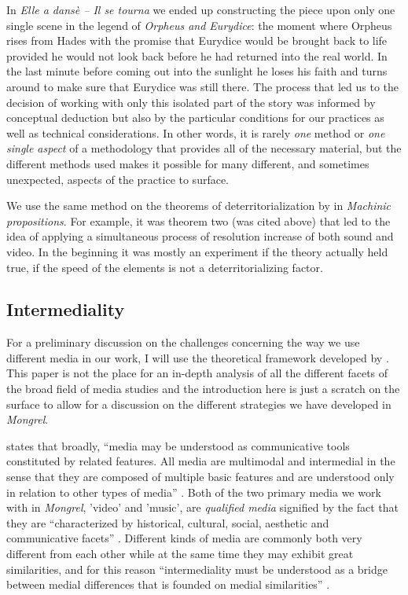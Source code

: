 \documentclass[11pt]{article}
\begin{document}
In \emph{Elle a dansè – Il se tourna} we ended up constructing the
piece upon only one single scene in the legend of \emph{Orpheus and
  Eurydice}: the moment where Orpheus rises from Hades with the
promise that Eurydice would be brought back to life provided he would
not look back before he had returned into the real world. In the last minute before coming out
into the sunlight he loses his faith and turns around to make sure
that Eurydice was still there. The process
that led us to the decision of working with only this isolated part of
the story was informed by conceptual deduction but also by the
particular conditions for our practices as well as technical
considerations. In other words, it is rarely \emph{one} method or \emph{one single
aspect} of a methodology that provides all of the necessary material,
but the different methods used makes it possible for many different,
and sometimes unexpected, aspects of the practice to surface.

We use the same method on the theorems of deterritorialization by
\citeauthor{deleuze80} in \emph{Machinic propositions}. For example,
it was theorem two (was cited above) that led to the idea of applying
a simultaneous
process of resolution increase of both sound and video. In the
beginning it was mostly an experiment if the theory actually held
true, if the speed of the elements is not a deterritorializing
factor. 


\subsection*{Intermediality}
\label{sec:intermediality}


For a preliminary discussion on the challenges concerning the way we
use different media in our work, I will use the
theoretical framework developed by \citet[][]{Ellestrom2010}. This paper is
not the place for an in-depth analysis of all the different facets of
the broad field of media studies and the introduction here is just a
scratch on the surface to allow for a discussion on the different
strategies we have developed in \emph{Mongrel}.

\citeauthor{Ellestrom2014} states that broadly, ``media may be
understood as communicative tools constituted by related features. All
media are multimodal and intermedial in the sense that they are
composed of multiple basic features and are understood only in
relation to other types of media'' \citep{Ellestrom2014}.  Both of the
two primary media we work with in \emph{Mongrel}, 'video' and 'music',
are \emph{qualified media} signified by the fact that they are
``characterized by historical, cultural, social, aesthetic and
communicative facets'' \citep[p. 5]{Ellestrom2010}. Different kinds
of media are commonly both very different from each other while
at the same time they may exhibit great similarities, and for this reason
``intermediality must be understood as a bridge between medial
differences that is founded on medial similarities''
\citep[p. 12]{Ellestrom2010}.
\end{document}
